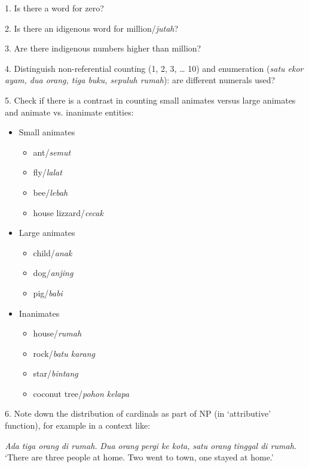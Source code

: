1. Is there a word for zero?

2. Is there an idigenous word for million/\textit{jutah}? 

3. Are there indigenous numbers higher than million?

4. Distinguish non-referential counting (1, 2, 3, {\dots} 10) and enumeration (\textit{satu ekor ayam, dua orang, tiga buku, sepuluh rumah}): are different numerals used?

5. Check if there is a contrast in counting small animates versus large animates and animate vs. inanimate entities: 

\begin{itemize}
\item Small animates

\begin{itemize}
\item ant/\textit{semut }
\item fly/\textit{lalat}
\item bee/\textit{lebah}
\item house lizzard/\textit{cecak}  
\end{itemize}
\item Large animates 

\begin{itemize}
\item child/\textit{anak} 
\item dog/\textit{anjing}
\item pig/\textit{babi} 
\end{itemize}
\item Inanimates

\begin{itemize}
\item house/\textit{rumah} 
\item rock/\textit{batu karang} 
\item star/\textit{bintang} 
\item coconut tree/\textit{pohon kelapa}
\end{itemize}
\end{itemize}
6. Note down the distribution of cardinals as part of NP (in {\textquoteleft}attributive{\textquoteright} function), for example in a context like:

\textit{Ada }\textit{tiga orang}\textit{ di rumah. }\textit{Dua orang}\textit{ pergi ke kota, }\textit{satu orang}\textit{ tinggal di rumah. }{\textquoteleft}There are three people at home. Two went to town, one stayed at home.{\textquoteright} 

